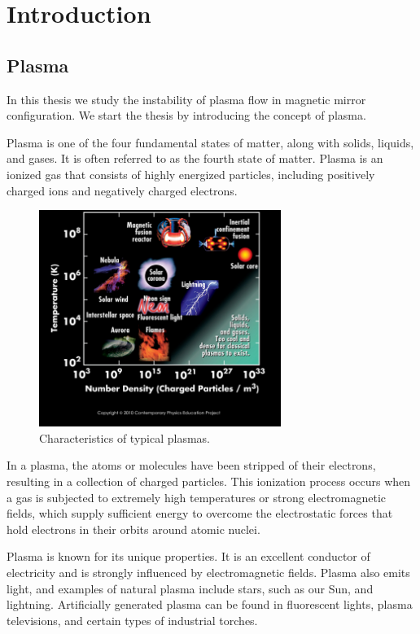 \chapter{Introduction}
\section{Plasma}
In this thesis we study the instability of plasma flow in magnetic mirror configuration. 
We start the thesis by introducing the concept of plasma.

Plasma is one of the four fundamental states of matter, along with solids, liquids, and gases. 
It is often referred to as the fourth state of matter. 
Plasma is an ionized gas that consists of highly energized particles, including positively charged ions and negatively charged electrons.

\begin{figure}[htbp]
    \centering
    \includegraphics[width=0.7\textwidth]{img/introduction/plasma-properties}
    \caption{Characteristics of typical plasmas.}
    \label{fig:plasma-properties}
\end{figure}

In a plasma, the atoms or molecules have been stripped of their electrons, resulting in a collection of charged particles. 
This ionization process occurs when a gas is subjected to extremely high temperatures or strong electromagnetic fields, which supply sufficient energy to overcome the electrostatic forces that hold electrons in their orbits around atomic nuclei.

Plasma is known for its unique properties. 
It is an excellent conductor of electricity and is strongly influenced by electromagnetic fields. 
Plasma also emits light, and examples of natural plasma include stars, such as our Sun, and lightning. 
Artificially generated plasma can be found in fluorescent lights, plasma televisions, and certain types of industrial torches.

